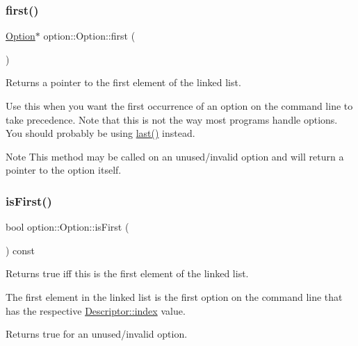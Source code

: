 \subsubsection{\texorpdfstring{first()}{first()}}
{\footnotesize\ttfamily \hyperlink{classoption_1_1Option}{Option}$\ast$ option\+::\+Option\+::first (\begin{DoxyParamCaption}{ }\end{DoxyParamCaption})\hspace{0.3cm}{\ttfamily [inline]}}



Returns a pointer to the first element of the linked list. 

Use this when you want the first occurrence of an option on the command line to take precedence. Note that this is not the way most programs handle options. You should probably be using \hyperlink{classoption_1_1Option_afe2aff68191e55b59c53fac3dbbcd7c3}{last()} instead.

\begin{DoxyNote}{Note}
This method may be called on an unused/invalid option and will return a pointer to the option itself. 
\end{DoxyNote}
\mbox{\label{classoption_1_1Option_af51f53a553ef46110e36008a58466a2e}} 
\subsubsection{\texorpdfstring{is\+First()}{isFirst()}}
{\footnotesize\ttfamily bool option\+::\+Option\+::is\+First (\begin{DoxyParamCaption}{ }\end{DoxyParamCaption}) const\hspace{0.3cm}{\ttfamily [inline]}}



Returns true iff this is the first element of the linked list. 

The first element in the linked list is the first option on the command line that has the respective \hyperlink{structoption_1_1Descriptor_a1fee8ac44f529c99ac2b1149b4c391b1}{Descriptor\+::index} value.

Returns true for an unused/invalid option. \mbox{\label{classoption_1_1Option_a36fa8fde6fce89462ded79ab56180ff7}} 
